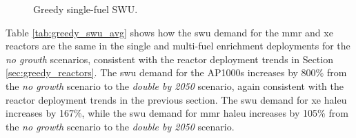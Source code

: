 
\begin{figure}[H]
  \hfill
  \caption{Greedy single-fuel SWU.}
  \label{fig:greedy_of_swu}
\end{figure}

Table \ref{tab:greedy_swu_avg} shows how the \gls{swu} demand for the \gls{mmr} and \gls{xe} reactors are the same in the single and multi-fuel enrichment deployments for the \textit{no growth} scenarios, consistent with the reactor deployment trends in Section \ref{sec:greedy_reactors}. The \gls{swu} demand for the AP1000s increases by 800\% from the \textit{no growth} scenario to the \textit{double by 2050} scenario, again consistent with the reactor deployment trends in the previous section. The \gls{swu} demand for \gls{xe} \gls{haleu} increases by 167\%, while the \gls{swu} demand for \gls{mmr} \gls{haleu} increases by 105\% from the \textit{no growth} scenario to the \textit{double by 2050} scenario.


